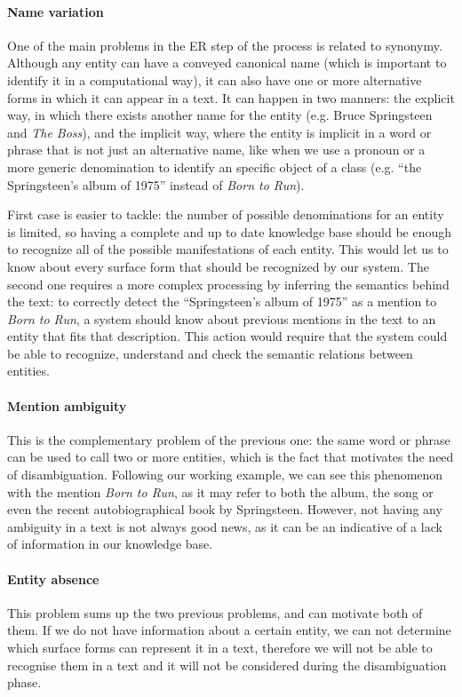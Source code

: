 \paragraph{Name variation} One of the main problems in the ER step of the process is related to synonymy. Although any entity can have a conveyed canonical name (which is important to identify it in a computational way), it can also have one or more alternative forms in which it can appear in a text. It can happen in two manners: the explicit way, in which there exists another name for the entity (e.g. Bruce Springsteen and \emph{The Boss}), and the implicit way, where the entity is implicit in a word or phrase that is not just an alternative name, like when we use a pronoun or a more generic denomination to identify an specific object of a class (e.g. ``the Springsteen's album of 1975'' instead of \textit{Born to Run}).

First case is easier to tackle: the number of possible denominations for an entity is limited, so having a complete and up to date knowledge base should be enough to recognize all of the possible manifestations of each entity. This would let us to know about every surface form that should be recognized by our system. The second one requires a more complex processing by inferring the semantics behind the text: to correctly detect the ``Springsteen's album of 1975'' as a mention to \textit{Born to Run}, a system should know about previous mentions in the text to an entity that fits that description. This action would require that the system could be able to recognize, understand and check the semantic relations between entities.

\paragraph{Mention ambiguity} This is the complementary problem of the previous one: the same word or phrase can be used to call two or more entities, which is the fact that motivates the need of disambiguation. Following our working example, we can see this phenomenon with the mention \textit{Born to Run}, as it may refer to both the album, the song or even the recent autobiographical book by Springsteen. However, not having any ambiguity in a text is not always good news, as it can be an indicative of a lack of information in our knowledge base. 

\paragraph{Entity absence} This problem sums up the two previous problems, and can motivate both of them. If we do not have information about a certain entity, we can not determine which surface forms can represent it in a text, therefore we will not be able to recognise them in a text and it will not be considered during the disambiguation phase.

